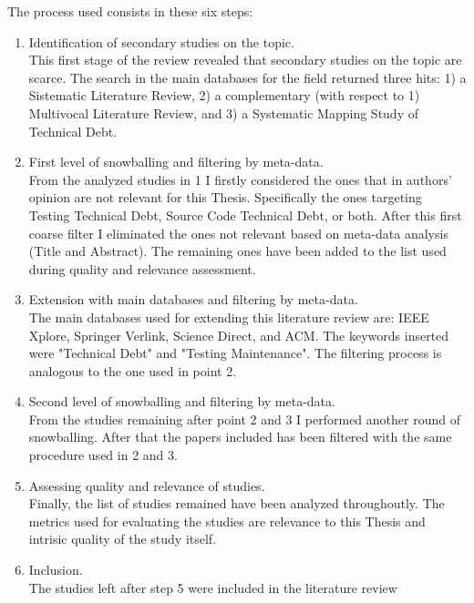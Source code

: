 The process used consists in these six steps:
\begin{enumerate}
    \item Identification of secondary studies on the topic.\\
        This first stage of the review revealed that secondary studies on the topic are scarce. The search in the main databases for the field returned three hits: 1) a Sistematic Literature Review, 2) a complementary (with respect to 1) Multivocal Literature Review, and 3) a Systematic Mapping Study of Technical Debt.
        
    \item First level of snowballing and filtering by meta-data.\\
        From the analyzed studies in 1 I firstly considered the ones that in authors' opinion are not relevant for this Thesis. Specifically the ones targeting Testing Technical Debt, Source Code Technical Debt, or both. After this first coarse filter I eliminated the ones not relevant based on meta-data analysis (Title and Abstract). The remaining ones have been added to the list used during quality and relevance assessment. 
        
    \item Extension with main databases and filtering by meta-data.\\
        The main databases used for extending this literature review are: IEEE Xplore, Springer Verlink, Science Direct, and ACM. The keywords inserted were "Technical Debt" and "Testing Maintenance". The filtering process is analogous to the one used in point 2.
    
    
    \item Second level of snowballing and filtering by meta-data.\\
        From the studies remaining after point 2 and 3 I performed another round of snowballing. After that the papers included has been filtered with the same procedure used in 2 and 3.
    
    
    \item Assessing quality and relevance of studies.\\
        Finally, the list of studies remained have been analyzed throughoutly. The metrics used for evaluating the studies are relevance to this Thesis and intrisic quality of the study itself. 
    
    
    \item Inclusion.\\
        The studies left after step 5 were included in the literature review
    
\end{enumerate}






